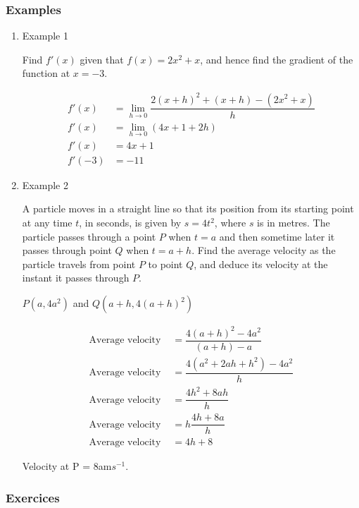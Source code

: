 \documentclass[11pt]{article}
\begin{document}
\subsubsection{Examples}
\label{sec:orgf7267b0}
\begin{enumerate}
\item Example 1
\label{sec:orgb27dff6}

Find \(f'(x)\) given that \(f(x) = 2x^2 + x\), and hence find the
gradient of the function at \(x = -3\).

\begin{align*}
f'(x) &= \lim_{h\to 0}\dfrac{2(x+h)^2+(x+h)-(2x^2+x)}{h}\\
f'(x) &= \lim_{h\to 0}(4x+1+2h)\\
f'(x) &= 4x+1\\
f'(-3) &= -11
\end{align*}

\item Example 2
\label{sec:org8d96471}

A particle moves in a straight line so that its position from its
starting point at any time \(t\), in seconds, is given by \(s =
     4t^2\), where \(s\) is in metres. The particle passes through a
point \(P\) when \(t = a\) and then sometime later it passes through
point \(Q\) when \(t = a + h\). Find the average velocity as the
particle travels from point \(P\) to point \(Q\), and deduce its
velocity at the instant it passes through \(P\).

\(P(a, 4a^2)\) and \(Q(a+h, 4(a+h)^2)\)

\begin{align*}
\text{Average velocity } &= \dfrac{4(a+h)^2-4a^2}{(a+h)-a}\\
\text{Average velocity } &= \dfrac{4(a^2+2ah+h^2)-4a^2}{h}\\
\text{Average velocity } &= \dfrac{4h^2+8ah}{h}\\
\text{Average velocity } &= h\dfrac{4h+8a}{h}\\
\text{Average velocity } &= 4h+8
\end{align*}

Velocity at P = 8am\(s^{-1}\).
\end{enumerate}

\subsubsection{Exercices}
\label{sec:org5e89ccc}
\end{document}

